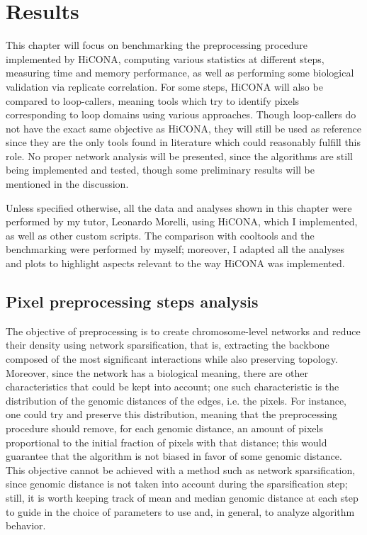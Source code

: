 \graphicspath{{chapters/05_results/images}}
\chapter{Results}

This chapter will focus on benchmarking the preprocessing procedure implemented by HiCONA, computing various statistics at different steps, measuring time and memory performance, as well as performing some biological validation via replicate correlation. For some steps, HiCONA will also be compared to loop-callers, meaning tools which try to identify pixels corresponding to loop domains using various approaches. Though loop-callers do not have the exact same objective as HiCONA, they will still be used as reference since they are the only tools found in literature which could reasonably fulfill this role. No proper network analysis will be presented, since the algorithms are still being implemented and tested, though some preliminary results will be mentioned in the discussion.

Unless specified otherwise, all the data and analyses shown in this chapter were performed by my tutor, Leonardo Morelli, using HiCONA, which I implemented, as well as other custom scripts. The comparison with cooltools and the benchmarking were performed by myself; moreover, I adapted all the analyses and plots to highlight aspects relevant to the way HiCONA was implemented.

\section{Pixel preprocessing steps analysis}

The objective of preprocessing is to create chromosome-level networks and reduce their density using network sparsification, that is, extracting the backbone composed of the most significant interactions while also preserving topology. Moreover, since the network has a biological meaning, there are other characteristics that could be kept into account; one such characteristic is the distribution of the genomic distances of the edges, i.e. the pixels. For instance, one could try and preserve this distribution, meaning that the preprocessing procedure should remove, for each genomic distance, an amount of pixels proportional to the initial fraction of pixels with that distance; this would guarantee that the algorithm is not biased in favor of some genomic distance. This objective cannot be achieved with a method such as network sparsification, since genomic distance is not taken into account during the sparsification step; still, it is worth keeping track of mean and median genomic distance at each step to guide in the choice of parameters to use and, in general, to analyze algorithm behavior. 

